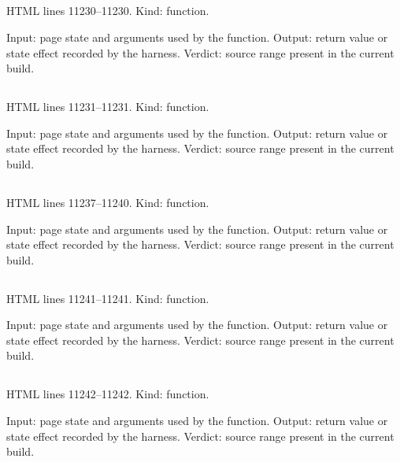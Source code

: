 \subsection*{\texttt{}}
\label{vf_617_selRemove}
HTML lines 11230--11230. Kind: function.

Input: page state and arguments used by the function.
Output: return value or state effect recorded by the harness.
Verdict: source range present in the current build.

\subsection*{\texttt{}}
\label{vf_618_selClear}
HTML lines 11231--11231. Kind: function.

Input: page state and arguments used by the function.
Output: return value or state effect recorded by the harness.
Verdict: source range present in the current build.

\subsection*{\texttt{}}
\label{vf_619_sopLab}
HTML lines 11237--11240. Kind: function.

Input: page state and arguments used by the function.
Output: return value or state effect recorded by the harness.
Verdict: source range present in the current build.

\subsection*{\texttt{}}
\label{vf_620_sopLabName}
HTML lines 11241--11241. Kind: function.

Input: page state and arguments used by the function.
Output: return value or state effect recorded by the harness.
Verdict: source range present in the current build.

\subsection*{\texttt{}}
\label{vf_621_sopAnalystName}
HTML lines 11242--11242. Kind: function.

Input: page state and arguments used by the function.
Output: return value or state effect recorded by the harness.
Verdict: source range present in the current build.

